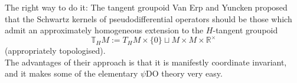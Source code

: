 \documentclass{beamer}
\numberwithin{equation}{section}
\theoremstyle{plain}
\theoremstyle{plain}
\theoremstyle{definition}
\theoremstyle{plain}
\theoremstyle{plain}
\theoremstyle{definition}
\newcommand{\Rl}{\mathbb{R}}
\newcommand{\Tb}{\mathbb{T}}
\begin{document}
\begin{frame}{The right way to do it: The tangent groupoid}
    Van Erp and Yuncken proposed that the Schwartz kernels of pseudodifferential operators should be those which admit an approximately homogeneous
    extension to the $H$-tangent groupoid
    \[
        \Tb_HM := T_HM\times \{0\}\sqcup M\times M\times \Rl^{\times}
    \]
    (appropriately topologised).\\
    \pause
    The advantages of their approach is that it is manifestly coordinate invariant, and it makes some of the elementary $\psi$DO theory very easy.
\end{frame}



%
%
%
%
%
%
\end{document}
